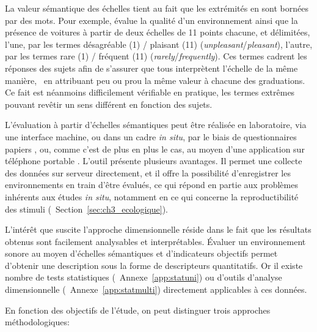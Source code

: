 La valeur sémantique des échelles tient au fait que les extrémités en sont bornées par des mots. Pour exemple, \citep{ricciardi2015sound} évalue la qualité d'un environnement ainsi que la présence de voitures à partir de deux échelles de 11 points chacune, et délimitées, l'une, par les termes désagréable (1) / plaisant (11) (\emph{unpleasant}/\emph{pleasant}), l'autre, par les termes rare (1) / fréquent (11) (\emph{rarely}/\emph{frequently}). Ces termes cadrent les réponses des sujets afin de s'assurer que tous interprètent l'échelle de la même manière, \ie~en attribuant  peu ou prou la même valeur à chacune des graduations. Ce fait est néanmoins difficilement vérifiable en pratique, les termes extrêmes pouvant revêtir un sens différent en fonction des sujets.

L'évaluation à partir d'échelles sémantiques peut être réalisée en laboratoire, via une interface machine, ou dans un cadre \emph{in situ}, par le biais de questionnaires papiers \citep{jeon2013soundwalk,torija2013application}, ou, comme c'est de plus en plus le cas, au moyen d'une application sur téléphone portable \citep{kardous2014evaluation,ricciardi2015sound}. L'outil présente plusieurs avantages. Il permet une collecte des données sur serveur directement, et il offre la possibilité d'enregistrer les environnements en train d'être évalués, ce qui répond en partie aux problèmes inhérents aux études \emph{in situ}, notamment en ce qui concerne la reproductibilité des stimuli (\cf~Section~\ref{sec:ch3_ecologique}).

L'intérêt que suscite l'approche dimensionnelle réside dans le fait que les résultats obtenus sont facilement analysables et interprétables. Évaluer un environnement sonore au moyen d'échelles sémantiques et d'indicateurs objectifs permet d'obtenir une description sous la forme de descripteurs quantitatifs. Or il existe nombre de tests statistiques (\cf~Annexe~\ref{app:statuni}) ou d'outils d'analyse dimensionnelle (\cf~Annexe~\ref{app:statmulti}) directement applicables à ces données.

En fonction des objectifs de l'étude, on peut distinguer trois approches méthodologiques:

